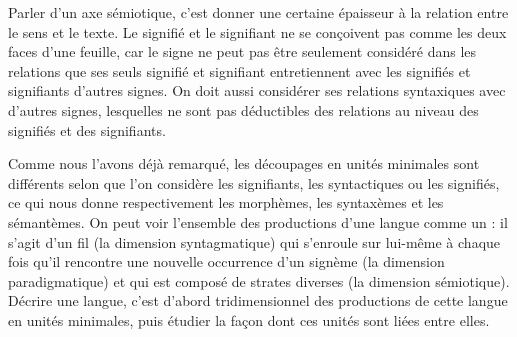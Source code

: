 Parler d’un axe sémiotique, c’est donner une certaine épaisseur à la relation entre le sens et le texte. Le signifié et le signifiant ne se conçoivent pas comme les deux faces d’une feuille, car le signe ne peut pas être seulement considéré dans les relations que ses seuls signifié et signifiant entretiennent avec les signifiés et signifiants d’autres signes. On doit aussi considérer ses relations syntaxiques avec d’autres signes, lesquelles ne sont pas déductibles des relations au niveau des signifiés et des signifiants.

Comme nous l’avons déjà remarqué, les découpages en unités minimales sont différents selon que l’on considère les signifiants, les syntactiques ou les signifiés, ce qui nous donne respectivement les morphèmes, les syntaxèmes et les sémantèmes. On peut voir l’ensemble des productions d’une langue comme un : il s’agit d’un fil (la dimension syntagmatique) qui s’enroule sur lui-même à chaque fois qu’il rencontre une nouvelle occurrence d’un signème (la dimension paradigmatique) et qui est composé de strates diverses (la dimension sémiotique). Décrire une langue, c’est d’abord  tridimensionnel des productions de cette langue en unités minimales, puis étudier la façon dont ces unités sont liées entre elles.

